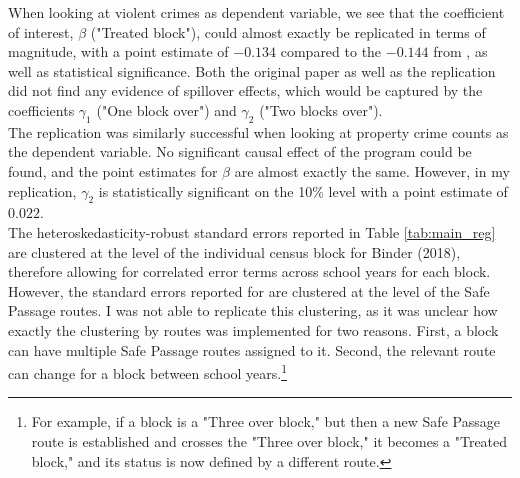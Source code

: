 \documentclass[]{article}
\begin{document}
When looking at violent crimes as dependent variable, we see that the coefficient of interest, $\beta$ ("Treated block"), could almost exactly be replicated in terms of magnitude, with a point estimate of $-0.134$ compared to the $-0.144$ from \cite{mcmillen2017}, as well as statistical significance. Both the original paper as well as the replication did not find any evidence of spillover effects, which would be captured by the coefficients $\gamma_1$ ("One block over") and $\gamma_2$ ("Two blocks over"). \\

The replication was similarly successful when looking at property crime counts as the dependent variable. No significant causal effect of the program could be found, and the point estimates for $\beta$ are almost exactly the same. However, in my replication, $\gamma_2$ is statistically significant on the 10\% level with a point estimate of $0.022$. \\

The heteroskedasticity-robust standard errors reported in Table \ref{tab:main_reg} are clustered at the level of the individual census block for Binder (2018), therefore allowing for correlated error terms across school years for each block. However, the standard errors reported for \cite{mcmillen2017} are clustered at the level of the Safe Passage routes. I was not able to replicate this clustering, as it was unclear how exactly the clustering by routes was implemented for two reasons. First, a block can have multiple Safe Passage routes assigned to it. Second, the relevant route can change for a block between school years.\footnote{For example, if a block is a "Three over block," but then a new Safe Passage route is established and crosses the "Three over block," it becomes a "Treated block," and its status is now defined by a different route.} \\
\end{document}
